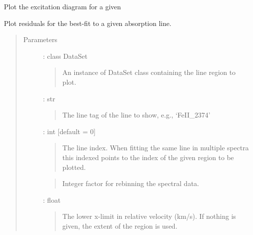 \documentclass[letterpaper,10pt,english]{sphinxmanual}
\begin{document}

\begin{fulllineitems}
\label{\detokenize{api:output.plot_excitation}}
Plot the excitation diagram for a given 

\end{fulllineitems}


\begin{fulllineitems}
\label{\detokenize{api:output.plot_residual}}
Plot residuals for the best-fit to a given absorption line.
\begin{quote}\begin{description}
\item[{Parameters}] \leavevmode
{} : class DataSet
\begin{quote}

An instance of DataSet class containing the line region to plot.
\end{quote}

 : str
\begin{quote}

The line tag of the line to show, e.g., ‘FeII\_2374’
\end{quote}

 : int   {[}default = 0{]}
\begin{quote}

The line index. When fitting the same line in multiple
spectra this indexed points to the index of the given region
to be plotted.
\end{quote}

\begin{quote}

Integer factor for rebinning the spectral data.
\end{quote}

 : float
\begin{quote}

The lower x-limit in relative velocity (km/s).
If nothing is given, the extent of the region is used.
\end{quote}


\end{description}
\end{quote}
\end{fulllineitems}
\end{document}
